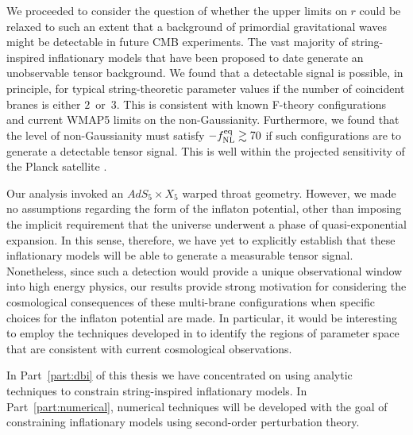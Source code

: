 We proceeded to consider the question of whether the upper limits on 
$r$ could be relaxed to such an extent 
that a background of primordial gravitational waves 
might be detectable in future CMB experiments. The vast majority of 
string-inspired inflationary models that have been proposed to date 
generate an unobservable tensor background. We 
found that a detectable signal is possible, in principle, 
for typical string-theoretic parameter values 
if the number of coincident branes is either $2$~or~$3$. 
This is consistent with known F-theory configurations and 
current WMAP5 limits on the non-Gaussianity. Furthermore, 
we found that the level of non-Gaussianity must satisfy $-f_{\mathrm{NL}}^{\mathrm{eq}} 
\gtrsim 70$ if such configurations are to generate a detectable tensor 
signal. This is well within the projected sensitivity 
of the Planck satellite \cite{planck}.   


Our analysis invoked an $AdS_5 \times X_5$ warped throat geometry. However, we 
made no assumptions regarding the form of the inflaton potential, other 
than imposing the implicit requirement that the universe underwent a phase of 
quasi-exponential expansion. In this sense, therefore, we have 
yet to explicitly establish that these inflationary models will 
be able to generate a measurable tensor signal. 
Nonetheless, since such a detection would provide a unique observational 
window into high energy physics, our results 
provide strong motivation for considering the cosmological consequences 
of these multi-brane configurations when specific choices for the 
inflaton potential are made. In particular, it would be interesting 
to employ the techniques developed in
to identify the regions of parameter space that are consistent 
with current cosmological observations.  

In Part~\ref{part:dbi} of this thesis we have concentrated on using analytic
techniques to constrain string-inspired inflationary models. 
In Part~\ref{part:numerical},
numerical techniques will be developed with the goal of constraining
inflationary models using second-order perturbation theory.

